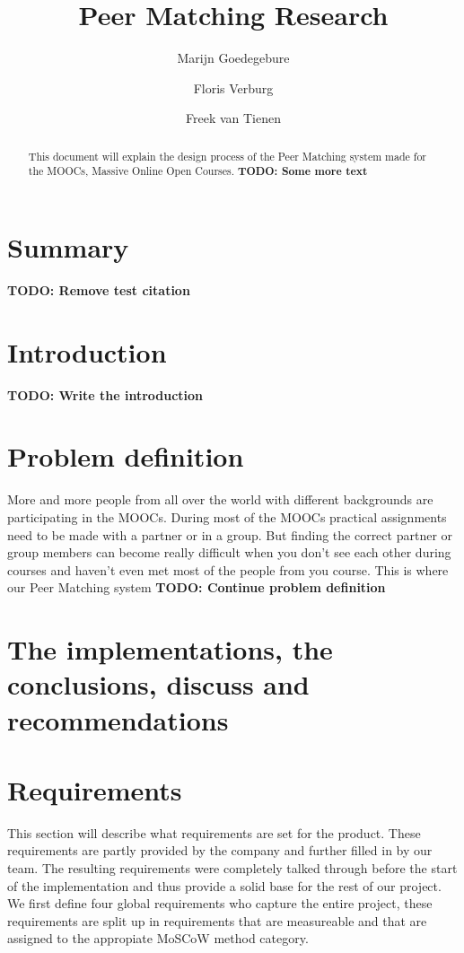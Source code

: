 \documentclass[]{article}
\title{Peer Matching Research}
\author{Marijn Goedegebure \and
	Floris Verburg \and
	Freek van Tienen}
\date{}
\newcommand{\TODO}[1]{{\color{red}\textbf{TODO: #1}}}
\begin{document}
\maketitle

\begin{abstract}
This document will explain the design process of the Peer Matching system made for the MOOCs, Massive Online Open Courses.
\TODO{Some more text}
\end{abstract}

\newpage

\tableofcontents

\newpage

\section{Summary}
\TODO{Remove test citation\cite{policella07}}

\section{Introduction}
\TODO{Write the introduction}

\section{Problem definition}
More and more people from all over the world with different backgrounds are participating in the MOOCs.
During most of the MOOCs practical assignments need to be made with a partner or in a group.
But finding the correct partner or group members can become really difficult when you don't see each other during courses and haven't even met most of the people from you course.
This is where our Peer Matching system \TODO{Continue problem definition}

\section{The implementations,	the conclusions, discuss and recommendations}

\section{Requirements}
This section will describe what requirements are set for the product.
These requirements are partly provided by the company and further filled in by our team.
The resulting requirements were completely talked through before the start of the implementation and thus provide a solid base for the rest of our project.
We first define four global requirements who capture the entire project, these requirements are split up in requirements that are measureable and that are assigned to the appropiate MoSCoW method category.
\end{document}
